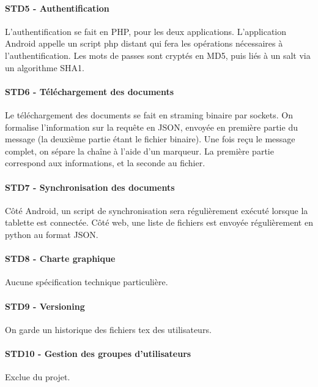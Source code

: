 \documentclass[a4paper,12pt]{article}
\begin{document}
\paragraph{STD5 - Authentification \\}
L'authentification se fait en PHP, pour les deux applications. L'application Android appelle un script php distant qui fera les opérations nécessaires à l'authentification. Les mots de passes sont cryptés en MD5, puis liés à un salt via un algorithme SHA1.

\paragraph{STD6 - Téléchargement des documents \\}
Le téléchargement des documents se fait en straming binaire par sockets. On formalise l'information sur la requête en JSON, envoyée en première partie du message (la deuxième partie étant le fichier binaire). Une fois reçu le message complet, on sépare la 
chaîne à l'aide d'un marqueur. La première partie correspond aux informations, et la seconde au fichier. 

\paragraph{STD7 - Synchronisation des documents \\}
Côté Android, un script de synchronisation sera régulièrement exécuté lorsque la tablette est connectée. Côté web, une liste de fichiers est envoyée régulièrement en python au format JSON.

\paragraph{STD8 - Charte graphique\\}
Aucune spécification technique particulière.

\paragraph{STD9 - Versioning\\}
On garde un historique des fichiers tex des utilisateurs.

\paragraph{STD10 - Gestion des groupes d'utilisateurs\\}
Exclue du projet.
\end{document}
